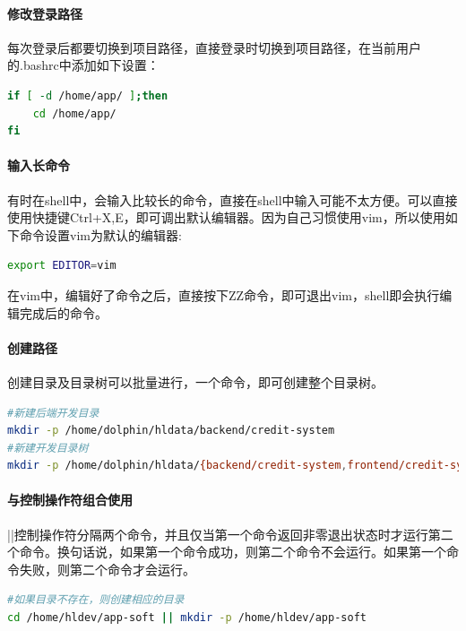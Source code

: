 \documentclass[letter]{book}
\begin{document}
\paragraph{修改登录路径}每次登录后都要切换到项目路径，直接登录时切换到项目路径，在当前用户的.bashrc中添加如下设置：

\begin{lstlisting}[language=Bash]
if [ -d /home/app/ ];then
	cd /home/app/
fi
\end{lstlisting}

\paragraph{输入长命令}有时在shell中，会输入比较长的命令，直接在shell中输入可能不太方便。可以直接使用快捷键Ctrl+X,E，即可调出默认编辑器。因为自己习惯使用vim，所以使用如下命令设置vim为默认的编辑器:

\begin{lstlisting}[language=Bash]
export EDITOR=vim
\end{lstlisting}

在vim中，编辑好了命令之后，直接按下ZZ命令，即可退出vim，shell即会执行编辑完成后的命令。

\paragraph{创建路径}创建目录及目录树可以批量进行，一个命令，即可创建整个目录树。

\begin{lstlisting}[language=Bash]
#新建后端开发目录
mkdir -p /home/dolphin/hldata/backend/credit-system
#新建开发目录树
mkdir -p /home/dolphin/hldata/{backend/credit-system,frontend/credit-system-frontend,doc/{html,info,pdf},demo/}
\end{lstlisting}

\paragraph{与控制操作符组合使用}||控制操作符分隔两个命令，并且仅当第一个命令返回非零退出状态时才运行第二个命令。换句话说，如果第一个命令成功，则第二个命令不会运行。如果第一个命令失败，则第二个命令才会运行。

\begin{lstlisting}[language=Bash]
#如果目录不存在，则创建相应的目录
cd /home/hldev/app-soft || mkdir -p /home/hldev/app-soft
\end{lstlisting}
\end{document}
